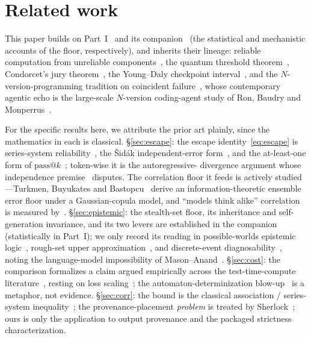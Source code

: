 \documentclass[11pt]{article}
\theoremstyle{definition}
\theoremstyle{remark}
\begin{document}
\section{Related work}\label{sec:related}
This paper builds on Part~I~\cite{matijasevic2026n1} and its companion~\cite{matijasevic2026gg} (the
statistical and mechanistic accounts of the floor, respectively), and inherits their lineage: reliable
computation from unreliable components~\cite{vonneumann1956,moore1956}, the quantum threshold
theorem~\cite{aharonov1997}, Condorcet's jury theorem~\cite{condorcet1785}, the Young--Daly
checkpoint interval~\cite{young1974,daly2006}, and the $N$-version-programming tradition on coincident
failure~\cite{eckhardt1985,littlewood1989,knight1986}, whose contemporary agentic echo is the
large-scale $N$-version coding-agent study of Ron, Baudry and Monperrus~\cite{ron2026}.

For the specific results here, we attribute the prior art plainly, since the mathematics in each is
classical. \S\ref{sec:escape}: the escape identity~\eqref{eq:escape} is series-system
reliability~\cite{barlowproschan1965}, the \v{S}id\'ak independent-error form~\cite{sidak1967}, and the
at-least-one form of $\mathrm{pass}@k$~\cite{chen2021,brown2024}; token-wise it is the autoregressive-%
divergence argument whose independence premise~\cite{arbuzov2025} disputes. The correlation floor it
feeds is actively studied---Turkmen, Buyukates and Bastopcu~\cite{turkmen2026} derive an
information-theoretic ensemble error floor under a Gaussian-copula model, and ``models think alike''
correlation is measured by~\cite{goel2025,kim2025}. \S\ref{sec:epistemic}: the stealth-set floor, its
inheritance and self-generation invariance, and its two levers are established in the
companion~\cite{matijasevic2026gg} (statistically in Part~I); we only record its reading in
possible-worlds epistemic logic~\cite{fagin1995,halpernmoses1990}, rough-set upper
approximation~\cite{pawlak1982}, and discrete-event diagnosability~\cite{sampath1995,debouk2000,descodiag2024},
noting the language-model impossibility of Mason--Anand~\cite{masonanand2026}. \S\ref{sec:cost}: the comparison formalizes a claim
argued empirically across the test-time-compute literature~\cite{snell2024,lifshitz2025,scalingverif2026},
resting on loss scaling~\cite{kaplan2020,hoffmann2022}; the automaton-determinization
blow-up~\cite{rabinscott1959,meyerfischer1971} is a metaphor, not evidence. \S\ref{sec:corr}: the
bound is the classical association / series-system inequality~\cite{esary1967,harris1960,fkg1971,barlowproschan1965};
the provenance-placement \emph{problem} is treated by Sherlock~\cite{ro2025sherlock}; ours is only the
application to output provenance and the packaged strictness characterization.
\end{document}
